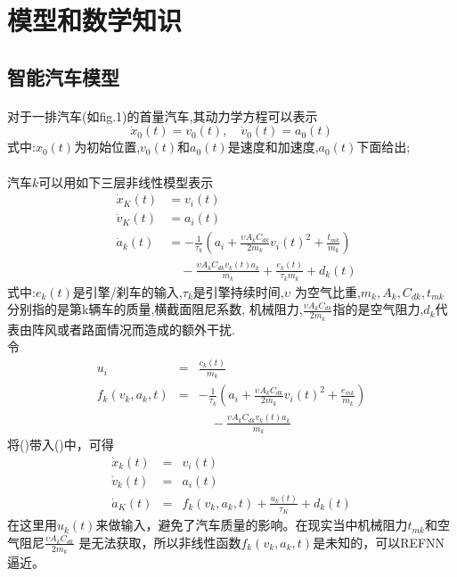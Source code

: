 \documentclass{cjc}
\begin{document}
\section{模型和数学知识}

  \subsection{智能汽车模型}
  \paragraph{}对于一排汽车(如fig.1)的首量汽车,其动力学方程可以表示\:
  \begin{equation} \dot{x}_0(t)=v_0(t),\quad \dot{v}_0(t)=a_0(t) \end{equation}
  式中:$x_0(t)$为初始位置,$v_0(t)$和$a_0(t)$是速度和加速度,$a_0(t)$下面给出;
  \paragraph{}汽车$k$可以用如下三层非线性模型表示\:
  \begin{eqnarray}
    &\dot{x}_K(t) &= v_i(t) \nonumber \\
    &\dot{v}_K(t) &= a_i(t) \nonumber \\
    &\dot{a}_k(t) &=-\frac{1}{\tau_k}(a_i+\frac{\upsilon A_k C_{dk}}{2m_k} v_i(t)^2+\frac{t_{mk}}{m_k}) \nonumber \\
    &&\quad  -\frac{\upsilon A_k C_{dk} v_k(t) a_k}{m_k} + \frac{e_k(t)}{\tau_k m_k}+d_k(t)    
  \end{eqnarray}
  式中:$e_k (t)$是引擎/刹车的输入,$\tau _k$是引擎持续时间,$\upsilon$ 为空气比重,$m_k,A_k,C_{dk},t_{mk}$分别指的是第k辆车的质量,横截面阻尼系数,
  机械阻力,$\frac{\upsilon A_k C_{dk}}{2m_k}$指的是空气阻力,$d_k$代表由阵风或者路面情况而造成的额外干扰.\\
  令
  \begin{eqnarray}
    u_i &=& \frac{c_k(t)}{m_k} \nonumber \\
    f_k(v_k,a_k,t) &=& -\frac{1}{\tau _k}(a_i+\frac{\upsilon A_k C_{dk}}{2m_k} v_i(t)^2+\frac{e_{mk}}{m_k}) \nonumber \\
    &&\quad -\frac{\upsilon A_k C_{dk} v_k(t) a_k}{m_k}
    \end{eqnarray}
    将()带入()中，可得\:
    \begin{eqnarray}
      \dot{x}_k(t) &=& v_i(t) \nonumber \\
      \dot{v}_k(t) &=& a_i(t) \nonumber \\
      \dot{a}_K(t) &=& f_k(v_k,a_k,t) + \frac{u_k(t)}{\tau _K} + d_k(t)
    \end{eqnarray}
    在这里用$u_k(t)$来做输入，避免了汽车质量的影响。在现实当中机械阻力$t_{mk}$和空气阻尼$\frac{\upsilon A_k C_{dk}}{2m_k}$
    是无法获取，所以非线性函数$f_k(v_k,a_k,t)$是未知的，可以REFNN逼近。
\end{document}
